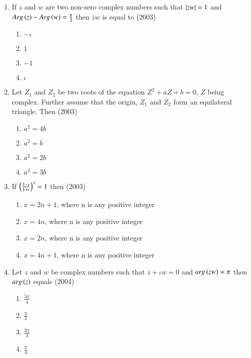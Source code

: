 \documentclass[journal]{IEEEtran}
\begin{document}
\begin{enumerate}
	\item{If $z$ and $w$ are two non-zero complex numbers such that $\left\vert zw\right\vert=1$ and $Arg\left(z\right) - Arg\left(w\right) = \frac{\pi}{2}$ then $\overline{z}w$ is equal to \hfill (2003)
		\begin{multicols}{4}
		\begin{enumerate}
			\item{$-\iota$}
			\columnbreak
			\item{$1$}
			\columnbreak
			\item{$-1$}
			\columnbreak
			\item{$\iota$}
		\end{enumerate}
		\end{multicols}}

	\item{Let $Z_1$ and $Z_2$ be two roots of the equation $Z^2 + aZ + b = 0$, $Z$ being complex. Further assume that the origin, $Z_1$ and $Z_2$ form an equilateral triangle. Then \hfill (2003)
		\begin{multicols}{4}
		\begin{enumerate}
			\item{$a^2 = 4b$}
			\columnbreak
			\item{$a^2 = b$}
			\columnbreak
			\item{$a^2 = 2b$}
			\columnbreak
			\item{$a^2 = 3b$}
		\end{enumerate}
		\end{multicols}}

	\item{If $\left(\frac{1-\iota}{1+\iota}\right)^x = 1$ then \hfill (2003)
		\begin{enumerate}
			\item{$x = 2n + 1$, where n is any positive integer}
			\item{$x = 4n$, where n is any positive integer}
			\item{$x = 2n$, where n is any positive integer}
			\item{$x = 4n + 1$, where n is any positive integer}
		\end{enumerate}}
		
	\item{Let $z$ and $w$ be complex numbers such that $\overline{z} + \iota\overline{w} = 0$ and $arg\left(zw\right) = \pi$ then $arg\left(z\right)$ equals \hfill (2004)
		\begin{multicols}{4}
		\begin{enumerate}
			\item{$\frac{5\pi}{4}$}
			\columnbreak 
			\item{$\frac{\pi}{2}$}
			\columnbreak
			\item{$\frac{3\pi}{4}$}
			\columnbreak
			\item{$\frac{\pi}{4}$}
		\end{enumerate}
		\end{multicols}}


\end{enumerate}
\end{document}
